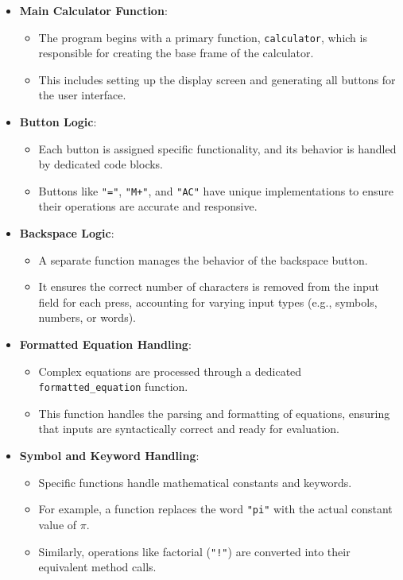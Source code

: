 \documentclass[a4paper,12pt]{article}
\begin{document}
\begin{itemize}
    \item \textbf{Main Calculator Function}:
    \begin{itemize}
        \item The program begins with a primary function, \texttt{calculator}, which is responsible for creating the base frame of the calculator.
        \item This includes setting up the display screen and generating all buttons for the user interface.
    \end{itemize}
    
    \item \textbf{Button Logic}:
    \begin{itemize}
        \item Each button is assigned specific functionality, and its behavior is handled by dedicated code blocks.
        \item Buttons like \texttt{"="}, \texttt{"M+"}, and \texttt{"AC"} have unique implementations to ensure their operations are accurate and responsive.
    \end{itemize}
    
    \item \textbf{Backspace Logic}:
    \begin{itemize}
        \item A separate function manages the behavior of the backspace button.
        \item It ensures the correct number of characters is removed from the input field for each press, accounting for varying input types (e.g., symbols, numbers, or words).
    \end{itemize}
    
    \item \textbf{Formatted Equation Handling}:
    \begin{itemize}
        \item Complex equations are processed through a dedicated \texttt{formatted\_equation} function.
        \item This function handles the parsing and formatting of equations, ensuring that inputs are syntactically correct and ready for evaluation.
    \end{itemize}
    
    \item \textbf{Symbol and Keyword Handling}:
    \begin{itemize}
        \item Specific functions handle mathematical constants and keywords.
        \item For example, a function replaces the word \texttt{"pi"} with the actual constant value of $\pi$.
        \item Similarly, operations like factorial (\texttt{"!"}) are converted into their equivalent method calls.
    \end{itemize}
    

\end{itemize}
\end{document}
